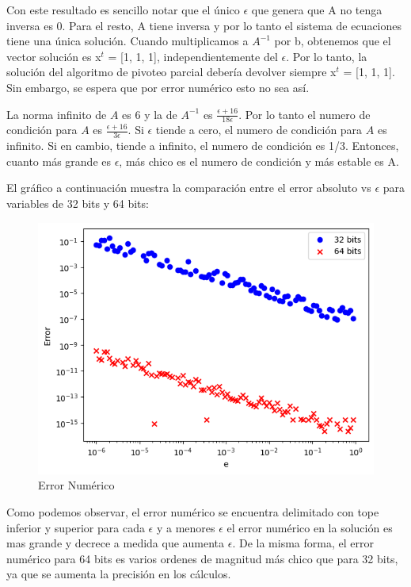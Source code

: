     Con este resultado es sencillo notar que el único $\epsilon$ que genera que A no tenga inversa es 0. Para el resto, A tiene inversa y por lo tanto el sistema de ecuaciones tiene una única solución. Cuando multiplicamos a $A^{-1}$ por b, obtenemos que el vector solución es x$^t$ = [1, 1, 1], independientemente del $\epsilon$. Por lo tanto, la solución del algoritmo de pivoteo parcial debería devolver siempre x$^t$ = [1, 1, 1]. Sin embargo, se espera que por error numérico esto no sea así. 

    La norma infinito de $A$ es 6 y la de $A^{-1}$ es $\frac{\epsilon+16}{18\epsilon}$. Por lo tanto el numero de condición para $A$ es $\frac{\epsilon+16}{3\epsilon}$. Si $\epsilon$ tiende a cero, el numero de condición para $A$ es infinito. Si en cambio, tiende a infinito, el numero de condición es 1/3. Entonces, cuanto más grande es $\epsilon$, más chico es el numero de condición y más estable es A. 

    El gráfico a continuación muestra la comparación entre el error absoluto vs $\epsilon$ para variables de 32 bits y 64 bits:

    \begin{figure}[htbp]
    \centerline{\includegraphics[scale=0.50]{./img/error_numerico_32vs64.png}}
    \caption{Error Numérico}
    \label{result_errorNumerico}
    \end{figure}

    Como podemos observar, el error numérico se encuentra delimitado con tope inferior y superior para cada $\epsilon$ y a menores $\epsilon$ el error numérico en la solución es mas grande y decrece a medida que aumenta $\epsilon$. De la misma forma, el error numérico para 64 bits es varios ordenes de magnitud más chico que para 32 bits, ya que se aumenta la precisión en los cálculos.

